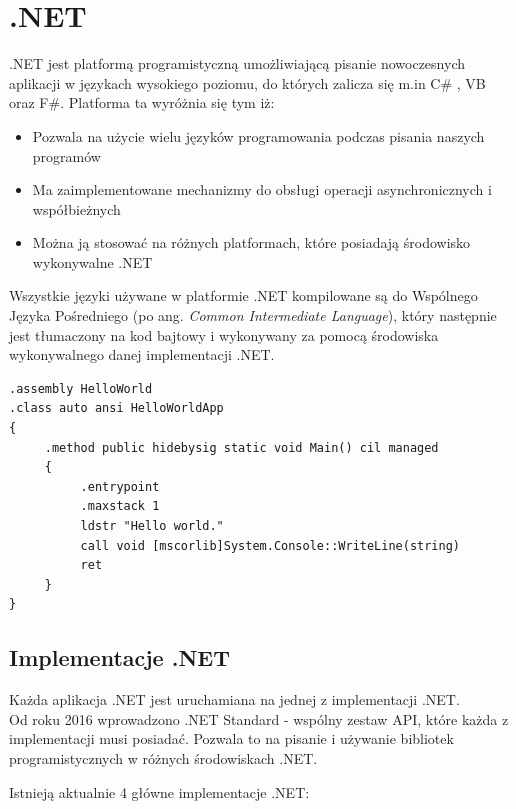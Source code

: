 \chapter{.NET}
\label{cha:wstep}

.NET jest platformą programistyczną umożliwiającą pisanie nowoczesnych aplikacji w językach wysokiego poziomu, do których zalicza się m.in C\# , VB oraz F\#. Platforma ta wyróżnia się tym iż:
\begin{itemize}
	\item Pozwala na użycie wielu języków programowania podczas pisania naszych programów
	\item Ma zaimplementowane mechanizmy do obsługi operacji asynchronicznych i współbieżnych
	\item Można ją stosować na różnych platformach, które posiadają środowisko wykonywalne .NET
\end{itemize}
Wszystkie języki używane w platformie .NET kompilowane są do Wspólnego Języka Pośredniego (po ang. \textit{Common Intermediate Language}), który następnie jest tłumaczony na kod bajtowy i wykonywany za pomocą środowiska wykonywalnego danej implementacji .NET.

\begin{lstlisting}[frame=single, numbers=none,captionpos=b, 
caption={Przykładowy kod aplikacji "Hello World" w języku CIL}]
.assembly HelloWorld
.class auto ansi HelloWorldApp
{
     .method public hidebysig static void Main() cil managed
     {
          .entrypoint
          .maxstack 1
          ldstr "Hello world."
          call void [mscorlib]System.Console::WriteLine(string)
          ret
     }
}
\end{lstlisting}


\section{Implementacje .NET}

Każda aplikacja .NET jest uruchamiana na jednej z implementacji .NET. \\
Od roku 2016 wprowadzono .NET Standard - wspólny zestaw API, które każda z implementacji musi posiadać. Pozwala to na pisanie i używanie bibliotek programistycznych w różnych środowiskach .NET.

Istnieją aktualnie 4 główne implementacje .NET:

